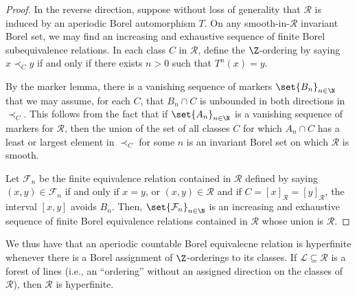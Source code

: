 \documentclass[10pt]{mypackage}
\begin{document}
\begin{proof}
  In the reverse direction, suppose without loss of generality that $\mathcal{R}$ is induced by an aperiodic Borel automorphism $T$. On any smooth-in-$\mathcal{R}$ invariant Borel set, we may find an increasing and exhaustive sequence of finite Borel subequivalence relations. In each class $C$ in $\mathcal{R}$, define the $\Z$-ordering by saying $x\prec_{C}y$ if and only if there exists $n > 0$ such that $T^{n}(x) = y$.

  By the marker lemma, there is a vanishing sequence of markers $\set{B_n}_{n\in \N}$ that we may assume, for each $C$, that $B_n\cap C$ is unbounded in both directions in $\prec_{C}$. This follows from the fact that if $\set{A_n}_{n\in \N}$ is a vanishing sequence of markers for $\mathcal{R}$, then the union of the set of all classes $C$ for which $A_n\cap C$ has a least or largest element in $\prec_{C}$ for some $n$ is an invariant Borel set on which $\mathcal{R}$ is smooth.

  Let $\mathcal{F}_n$ be the finite equivalence relation contained in $\mathcal{R}$ defined by saying $\left( x,y \right)\in \mathcal{F}_n$ if and only if $x = y$, or $\left( x,y \right)\in \mathcal{R}$ and if $C = \left[ x \right]_{\mathcal{R}} = \left[ y \right]_{\mathcal{R}}$, the interval $\left[ x,y \right]$ avoids $B_n$. Then, $\set{\mathcal{F}_n}_{n\in \N}$ is an increasing and exhaustive sequence of finite Borel equivalence relations contained in $\mathcal{R}$ whose union is $\mathcal{R}$.
\end{proof}
We thus have that an aperiodic countable Borel equivalecne relation is hyperfinite whenever there is a Borel assignment of $\Z$-orderings to its classes. If $\mathcal{L}\subseteq \mathcal{R}$ is a forest of lines (i.e., an ``ordering'' without an assigned direction on the classes of $\mathcal{R}$), then $\mathcal{R}$ is hyperfinite.
\end{document}
